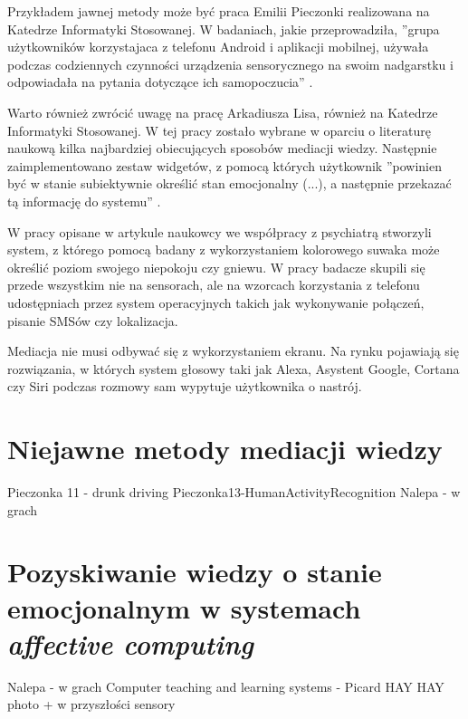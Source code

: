 Przykładem jawnej metody może być praca Emilii Pieczonki realizowana na Katedrze Informatyki Stosowanej. W badaniach, jakie przeprowadziła, ''grupa użytkowników korzystajaca z telefonu Android i aplikacji mobilnej, używała podczas codziennych czynności urządzenia sensorycznego na swoim nadgarstku i odpowiadała na pytania dotyczące ich samopoczucia'' \cite{EmiliaPieczonka}.

Warto również zwrócić uwagę na pracę Arkadiusza Lisa, również na Katedrze Informatyki Stosowanej. W tej pracy zostało wybrane w oparciu o literaturę naukową kilka najbardziej obiecujących sposobów mediacji wiedzy. Następnie zaimplementowano zestaw widgetów, z pomocą których użytkownik ''powinien być w stanie subiektywnie określić stan emocjonalny (...), a następnie przekazać tą informację do systemu'' \cite{ArkadiuszLis}.

W pracy opisane w artykule \cite{hung2016predicting} naukowcy we współpracy z psychiatrą stworzyli system, z którego pomocą badany z wykorzystaniem kolorowego suwaka może określić poziom swojego niepokoju czy gniewu. W pracy badacze skupili się przede wszystkim nie na sensorach, ale na wzorcach korzystania z telefonu udostępniach przez system operacyjnych takich jak wykonywanie połączeń, pisanie SMSów czy lokalizacja.

Mediacja nie musi odbywać się z wykorzystaniem ekranu. Na rynku pojawiają się rozwiązania, w których system głosowy taki jak Alexa, Asystent Google, Cortana czy Siri podczas rozmowy sam wypytuje użytkownika o nastrój.



\section{Niejawne metody mediacji wiedzy}
\label{sec:niejawneMetodyMediacjiWiedzy}


Pieczonka 11 - drunk driving
Pieczonka13-HumanActivityRecognition
Nalepa - w grach



\section{Pozyskiwanie wiedzy o stanie emocjonalnym w systemach \textit{affective computing}}
\label{sec:pozyskiwanieWiedzyOStanieEmocjonalnymWSystemachAffectiveComputing}

Nalepa - w grach
Computer teaching and learning systems - Picard
HAY
HAY photo + w przyszłości sensory
